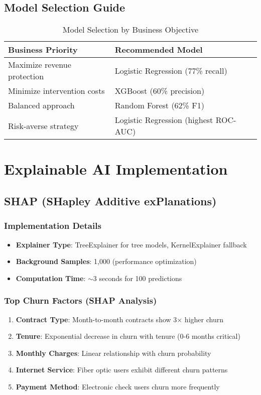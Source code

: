 \documentclass[11pt,a4paper]{article}
\begin{document}
\subsection{Model Selection Guide}

\begin{table}[h]
\centering
\begin{tabular}{@{}ll@{}}
\toprule
\textbf{Business Priority} & \textbf{Recommended Model} \\ \midrule
Maximize revenue protection & Logistic Regression (77\% recall) \\
Minimize intervention costs & XGBoost (60\% precision) \\
Balanced approach & Random Forest (62\% F1) \\
Risk-averse strategy & Logistic Regression (highest ROC-AUC) \\ \bottomrule
\end{tabular}
\caption{Model Selection by Business Objective}
\end{table}

\section{Explainable AI Implementation}

\subsection{SHAP (SHapley Additive exPlanations)}

\subsubsection{Implementation Details}
\begin{itemize}
    \item \textbf{Explainer Type}: TreeExplainer for tree models, KernelExplainer fallback
    \item \textbf{Background Samples}: 1,000 (performance optimization)
    \item \textbf{Computation Time}: $\sim$3 seconds for 100 predictions
\end{itemize}

\subsubsection{Top Churn Factors (SHAP Analysis)}
\begin{enumerate}
    \item \textbf{Contract Type}: Month-to-month contracts show 3$\times$ higher churn
    \item \textbf{Tenure}: Exponential decrease in churn with tenure (0-6 months critical)
    \item \textbf{Monthly Charges}: Linear relationship with churn probability
    \item \textbf{Internet Service}: Fiber optic users exhibit different churn patterns
    \item \textbf{Payment Method}: Electronic check users churn more frequently
\end{enumerate}
\end{document}
